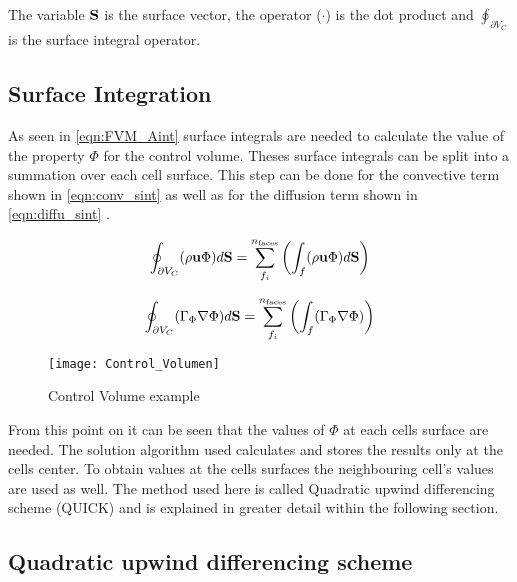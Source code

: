 \documentclass[../thesis.tex]{subfiles}
\begin{document}
The variable $ \bold{S}$ is the surface vector, the operator ($\cdot$) is the dot product and $ \oint_{\partial V_C}$ is the surface integral operator.

\subsection{Surface Integration}

As seen in \autoref{eqn:FVM_Aint} surface integrals are needed to calculate the value of the property $\Phi$ for the control volume. Theses surface integrals can be split into a summation over each cell surface. This step can be done for the convective term shown in \autoref{eqn:conv_sint} as well as for the diffusion term shown in \autoref{eqn:diffu_sint} \cite{darwish2021finite}.

\begin{equation}
	\label{eqn:conv_sint}
	\oint_{\partial V_C} (\rho \bold{u} \Phi) d\bold{S} = \sum_{f_i}^{n_{\text{faces}}}\left( \int_{f} (\rho \bold{u} \Phi) d\bold{S} \right)
\end{equation}

\begin{equation}
	\label{eqn:diffu_sint}
	\oint_{\partial V_C} (\Gamma_\Phi \nabla \Phi) d\bold{S} =  \sum_{f_i}^{n_{\text{faces}}}\left( \int_{f} (\Gamma_\Phi \nabla \Phi) \right)
\end{equation} 

\begin{figure}[htbp]
	\centering
	\texttt{[image: Control\_Volumen]}
	\caption{Control Volume example}
	\label{fig:FVM_CV}
\end{figure}

From this point on it can be seen that the values of $\Phi$ at each cells surface are needed. The solution algorithm used calculates and stores the results only at the cells center. To obtain values at the cells surfaces the neighbouring cell's values are used as well. The method used here is called Quadratic upwind differencing scheme (QUICK) and is explained in greater detail within the following section.

\subsection{Quadratic upwind differencing scheme}
\label{sec:QUICK}
\end{document}
